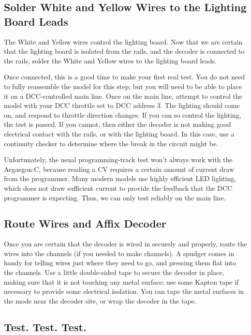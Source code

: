 \documentclass[12pt,letterpaper,draft]{memoir} %
\begin{document}
\subsection{Solder White and Yellow Wires to the Lighting Board Leads}

The White and Yellow wires control the lighting board. Now that we are certain that the lighting board is isolated from the rails, and the decoder is connected to the rails, solder the White and Yellow wires to the lighting board leads.

Once connected, this is a good time to make your first real test. You do not need to fully reassemble the model for this step; but you will need to be able to place it on a DCC-controlled main line. Once on the main line, attempt to control the model with your DCC throttle set to DCC address 3. The lighting should come on, and respond to throttle direction changes. If you can so control the lighting, the test is passed. If you cannot, then either the decoder is not making good electrical contact with the rails, or with the lighting board. In this case, use a continuity checker to determine where the break in the circuit might be.

Unfortunately, the usual programming-track test won't always work with the Aegaegon:C, because reading a CV requires a certain amount of current draw from the programmer. Many modern models use highly efficient LED lighting, which does not draw sufficient current to provide the feedback that the DCC programmer is expecting. Thus, we can only test reliably on the main line.

\subsection{Route Wires and Affix Decoder}

Once you are certain that the decoder is wired in securely and properly, route the wires into the channels (if you needed to make channels). A spudger comes in handy for telling wires just where they need to go, and pressing them flat into the channels. Use a little double-sided tape to secure the decoder in place, making sure that it is not touching any metal surface; use some Kapton tape if necessary to provide some electrical isolation. You can tape the metal surfaces in the mode near the decoder site, or wrap the decoder in the tape.

\subsection {Test. Test. Test.}
\end{document}
